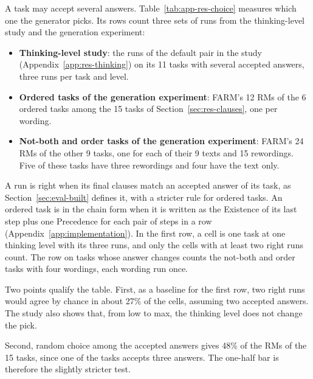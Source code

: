 \documentclass[11pt,english,listoffigures,listoftables]{tfgetsinf}
\begin{document}
A task may accept several answers. Table~\ref{tab:app-res-choice} measures which one the generator picks. Its rows count three sets of runs from the thinking-level study and the generation experiment:
\begin{itemize}
    \item \textbf{Thinking-level study}: the runs of the default pair in the study (Appendix~\ref{app:res-thinking}) on its 11 tasks with several accepted answers, three runs per task and level.
    \item \textbf{Ordered tasks of the generation experiment}: FARM's 12 RMs of the 6 ordered tasks among the 15 tasks of Section~\ref{sec:res-clauses}, one per wording.
    \item \textbf{Not-both and order tasks of the generation experiment}: FARM's 24 RMs of the other 9 tasks, one for each of their 9 texts and 15 rewordings. Five of these tasks have three rewordings and four have the text only.
\end{itemize}

A run is right when its final clauses match an accepted answer of its task, as Section~\ref{sec:eval-built} defines it, with a stricter rule for ordered tasks. An ordered task is in the chain form when it is written as the Existence of its last step plus one Precedence for each pair of steps in a row (Appendix~\ref{app:implementation}). In the first row, a cell is one task at one thinking level with its three runs, and only the cells with at least two right runs count. The row on tasks whose answer changes counts the not-both and order tasks with four wordings, each wording run once.

Two points qualify the table. First, as a baseline for the first row, two right runs would agree by chance in about 27\% of the cells, assuming two accepted answers. The study also shows that, from low to max, the thinking level does not change the pick.

Second, random choice among the accepted answers gives 48\% of the RMs of the 15 tasks, since one of the tasks accepts three answers. The one-half bar is therefore the slightly stricter test.
\end{document}
